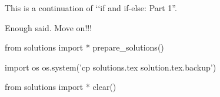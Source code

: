 
This is a continuation of \lq\lq if and if-else: Part 1''.

Enough said. Move on!!!



























\begin{python0}
from solutions import *
prepare_solutions()
\end{python0}
\begin{python}
import os
os.system('cp solutions.tex solution.tex.backup')  
\end{python}

\begin{python0}
from solutions import *
clear()
\end{python0}

